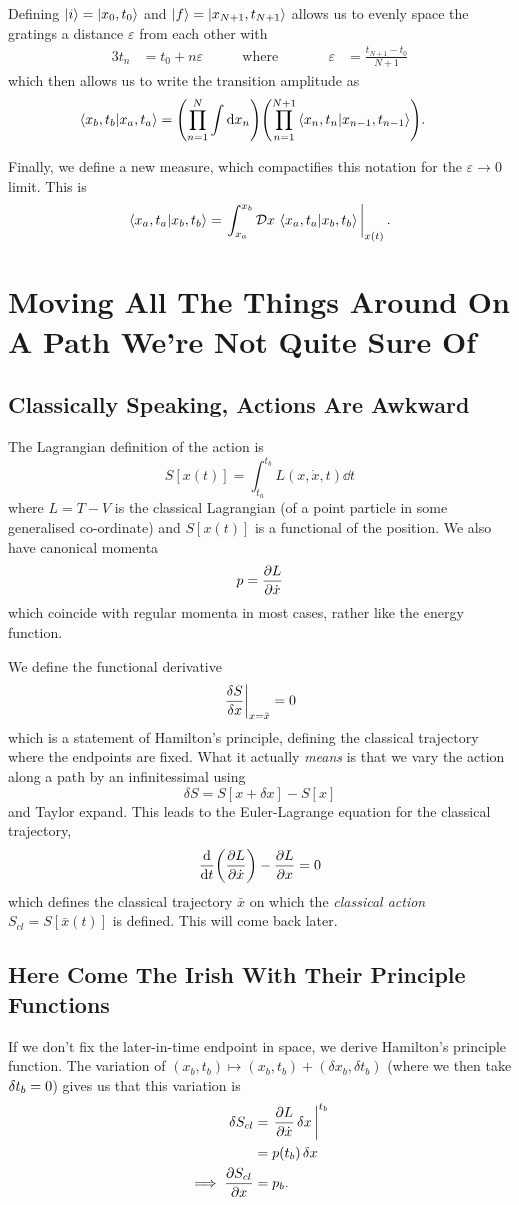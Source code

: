 \documentclass[]{scrreprt}
\newcommand{\DD}[1]{\ensuremath{\mathcal{D} #1\,}}
\begin{document}
Defining \(\ket{i} = \ket{x_0, t_0} \) and \( \ket{f} = \ket{x_{N+1}, t_{N+1}} \) allows us to evenly space the gratings a distance \( \varepsilon \) from each other with
\begin{alignat*}{3}
  t_n &= t_0 + n\varepsilon & \qquad \text{where}&\qquad& \varepsilon &= \frac{t_{N+1} - t_0}{N+1}
\end{alignat*}
which then allows us to write the transition amplitude as
\begin{align*}
  \braket{x_b, t_b}{x_a, t_a} &= \qty(\prod_{n=1}^{N}\int\dd{x_n})\qty(\prod_{n=1}^{N+1}\braket{x_{n}, t_{n}}{x_{n-1}, t_{n-1}}).
\end{align*}

Finally, we define a new measure, which compactifies this notation for the \(\varepsilon \to 0 \) limit.
This is \[ \braket{x_a, t_a}{x_b, t_b} =  \eval{\int_{x_a}^{x_b}\DD{x}\braket{x_a, t_a}{x_b, t_b}}_{x(t)}. \]

\chapter{Moving All The Things Around On A Path We're Not Quite Sure Of}
\section{Classically Speaking, Actions Are Awkward}
The Lagrangian definition of the action is \[ S[x(t)] = \int_{t_a}^{t_b} L(x, \dot{x}, t) \dd{t} \]
where \(L = T-V \) is the classical Lagrangian (of a point particle in some generalised co-ordinate) and \(S[x(t)]\) is a functional of the position. We also have canonical momenta \[ p = \pdv{L}{\dot{x}} \] which coincide with regular momenta in most cases, rather like the energy function.

We define the functional derivative
\[ \eval{\frac{\delta S}{\delta x}}_{x = \bar x} = 0 \] which is a statement of Hamilton's principle, defining the classical trajectory where the endpoints are fixed. What it actually \emph{means} is that we vary the action along a path by an infinitessimal using \[ \delta S = S[x + \delta x] - S[x] \] and Taylor expand. This leads to the Euler-Lagrange equation for the classical trajectory, \[ \dv{t}(\pdv{L}{\dot x}) - \pdv{L}{x} = 0 \] which defines the classical trajectory \(\bar{x} \) on which the \emph{classical action}
\(S_{cl} = S[\bar x(t)]\) is defined. This will come back later.

\section{Here Come The Irish With Their Principle Functions}
If we don't fix the later-in-time endpoint in space, we derive Hamilton's principle function.
The variation of \( (x_b, t_b) \mapsto (x_b, t_b) + (\delta x_b, \delta t_b)\) (where we then take \(\variation{t_b} = 0\)) gives us that this variation is \begin{align*}
  \variation{S_{cl}} &= \eval{\pdv{L}{\dot{x}}\variation{x}}^{t_b}\\
  &= p(t_b)\variation{x}\\
  \implies \pdv{S_{cl}}{x} &= p_b.
\end{align*}
\end{document}
